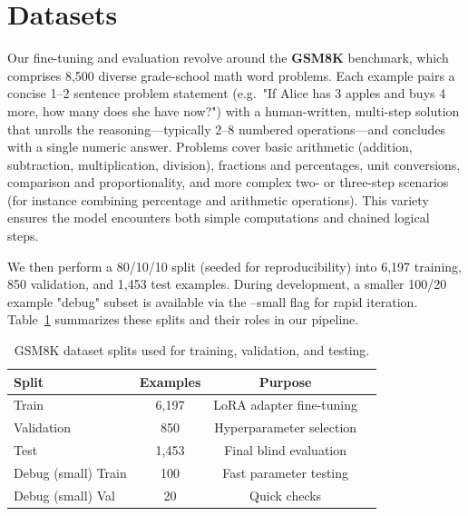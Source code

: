 \documentclass[11pt]{article}
\begin{document}
\section{Datasets}

Our fine-tuning and evaluation revolve around the \textbf{GSM8K} benchmark, which comprises 8,500 diverse grade-school math word problems. Each example pairs a concise 1–2 sentence problem statement (e.g.\ "If Alice has 3 apples and buys 4 more, how many does she have now?") with a human-written, multi-step solution that unrolls the reasoning—typically 2–8 numbered operations—and concludes with a single numeric answer. Problems cover basic arithmetic (addition, subtraction, multiplication, division), fractions and percentages, unit conversions, comparison and proportionality, and more complex two- or three-step scenarios (for instance combining percentage and arithmetic operations). This variety ensures the model encounters both simple computations and chained logical steps.

We then perform a 80/10/10 split (seeded for reproducibility) into 6,197 training, 850 validation, and 1,453 test examples. During development, a smaller 100/20 example "debug" subset is available via the --small flag for rapid iteration. Table~\ref{tab:datasets} summarizes these splits and their roles in our pipeline.

\begin{table}[h]
    \centering
    \begin{tabular}{lccc}
        \toprule
        \textbf{Split}      & \textbf{Examples} & \textbf{Purpose}                         \\
        \midrule
        Train               & 6,197             & LoRA adapter fine-tuning                 \\
        Validation          &   850             & Hyperparameter selection                 \\
        Test                & 1,453             & Final blind evaluation                   \\
        \midrule
        Debug (small) Train &   100             & Fast parameter testing                         \\
        Debug (small) Val   &    20             & Quick  checks                      \\
        \bottomrule
    \end{tabular}
    \caption{GSM8K dataset splits used for training, validation, and testing.}
    \label{tab:datasets}
\end{table}
\end{document}
